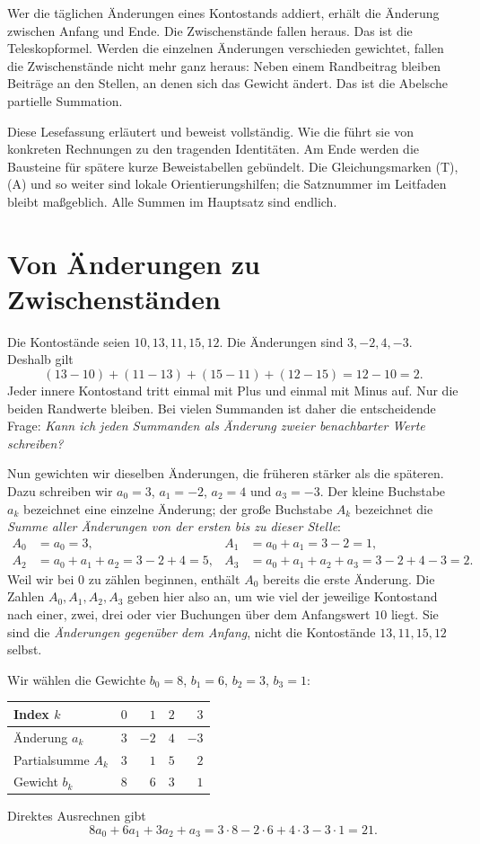 Wer die täglichen Änderungen eines Kontostands addiert, erhält die
Änderung zwischen Anfang und Ende. Die Zwischenstände fallen heraus.
Das ist die Teleskopformel. Werden die einzelnen Änderungen verschieden
gewichtet, fallen die Zwischenstände nicht mehr ganz heraus:
Neben einem Randbeitrag bleiben Beiträge an den Stellen, an denen sich
das Gewicht ändert.
Das ist die Abelsche partielle Summation.

Diese Lesefassung erläutert und beweist \GuideLink{} vollständig.
Wie die \NewtonLink{} führt sie von konkreten Rechnungen zu den
tragenden Identitäten. Am Ende werden die Bausteine für spätere kurze
Beweistabellen gebündelt. Die Gleichungsmarken (T), (A) und so weiter
sind lokale Orientierungshilfen; die Satznummer im Leitfaden bleibt
maßgeblich. Alle Summen im Hauptsatz sind endlich.

\section{Von Änderungen zu Zwischenständen}

Die Kontostände seien $10,13,11,15,12$. Die Änderungen sind
$3,-2,4,-3$. Deshalb gilt
\[
 (13-10)+(11-13)+(15-11)+(12-15)=12-10=2.
\]
Jeder innere Kontostand tritt einmal mit Plus und einmal mit Minus auf.
Nur die beiden Randwerte bleiben. Bei vielen Summanden ist daher die
entscheidende Frage: \emph{Kann ich jeden Summanden als Änderung
zweier benachbarter Werte schreiben?}

Nun gewichten wir dieselben Änderungen, die früheren stärker als
die späteren. Dazu schreiben wir $a_0=3$, $a_1=-2$, $a_2=4$ und
$a_3=-3$. Der kleine Buchstabe $a_k$ bezeichnet eine einzelne Änderung;
der große Buchstabe $A_k$ bezeichnet die \emph{Summe aller Änderungen
von der ersten bis zu dieser Stelle}:
\[
 \begin{aligned}
 A_0&=a_0=3, & A_1&=a_0+a_1=3-2=1,\\
 A_2&=a_0+a_1+a_2=3-2+4=5,
 & A_3&=a_0+a_1+a_2+a_3=3-2+4-3=2.
 \end{aligned}
\]
Weil wir bei $0$ zu zählen beginnen, enthält $A_0$ bereits die erste
Änderung. Die Zahlen $A_0,A_1,A_2,A_3$ geben hier also an, um wie viel
der jeweilige Kontostand nach einer, zwei, drei oder vier Buchungen
über dem Anfangswert $10$ liegt. Sie sind die \emph{Änderungen gegenüber
dem Anfang}, nicht die Kontostände $13,11,15,12$ selbst.

Wir wählen die Gewichte $b_0=8$, $b_1=6$, $b_2=3$, $b_3=1$:
\begin{center}
\begin{tabular}{@{}lrrrr@{}}
\toprule
Index $k$ & $0$ & $1$ & $2$ & $3$\\
\midrule
Änderung $a_k$ & $3$ & $-2$ & $4$ & $-3$\\
Partialsumme $A_k$ & $3$ & $1$ & $5$ & $2$\\
Gewicht $b_k$ & $8$ & $6$ & $3$ & $1$\\
\bottomrule
\end{tabular}
\end{center}
Direktes Ausrechnen gibt
\[
 8a_0+6a_1+3a_2+a_3=3\cdot8-2\cdot6+4\cdot3-3\cdot1=21.
\]


